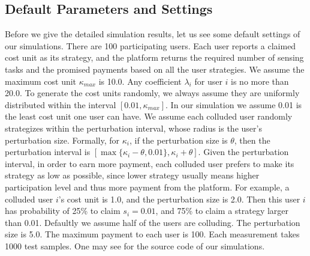 \documentclass[conference]{IEEEtran}
\theoremstyle{definition}
\begin{document}
{\subsection{Default Parameters and Settings}
Before we give the detailed simulation results, let us see some default settings of our simulations. There are 100 participating users. Each user reports a claimed cost unit as its strategy, and the platform returns the required number of sensing tasks and the promised payments based on all the user strategies. We assume the maximum cost unit $\kappa_{max}$ is 10.0. %
Any coefficient $\lambda_i$ for user $i$ is no more than 20.0. To generate the cost units randomly, we always assume they are uniformly distributed within the interval $[0.01,\kappa_{max}]$. In our simulation we assume 0.01 is the least cost unit one user can have. We assume each colluded user randomly strategizes within the perturbation interval, whose radius is the user's perturbation size. Formally, for $\kappa_i$, if the perturbation size is $\theta$, then the perturbation interval is $[\max\{\kappa_i-\theta,0.01\},\kappa_i+\theta]$. Given the perturbation interval, in order to earn more payment, each colluded user prefers to make its strategy as low as possible, since lower strategy usually means higher participation level and thus more payment from the platform. For example, a colluded user $i$'s cost unit is 1.0, and the perturbation size is 2.0. Then this user $i$ has probability of 25\% to claim $s_i=0.01$, and 75\% to claim a strategy larger than 0.01. Defaultly we assume half of the users are colluding. The perturbation size is 5.0. The maximum payment to each user is 100. Each measurement takes 1000 test samples. One may see \cite{mycodes} for the source code of our simulations.

}
\end{document}
